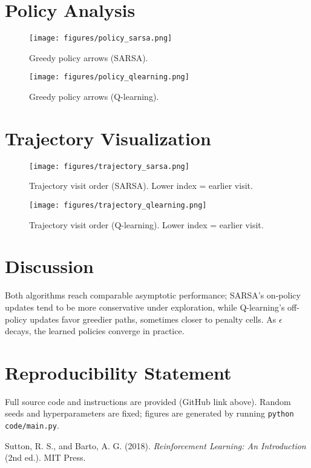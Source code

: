\documentclass[11pt]{article}
\begin{document}
\section{Policy Analysis}
\begin{figure}[H]
  \centering
  \texttt{[image: figures/policy\_sarsa.png]}
  \caption{Greedy policy arrows (SARSA).}
  \label{fig:pol_sarsa}
\end{figure}

\begin{figure}[H]
  \centering
  \texttt{[image: figures/policy\_qlearning.png]}
  \caption{Greedy policy arrows (Q-learning).}
  \label{fig:pol_q}
\end{figure}

\section{Trajectory Visualization}
\begin{figure}[H]
  \centering
  \texttt{[image: figures/trajectory\_sarsa.png]}
  \caption{Trajectory visit order (SARSA). Lower index = earlier visit.}
  \label{fig:traj_sarsa}
\end{figure}

\begin{figure}[H]
  \centering
  \texttt{[image: figures/trajectory\_qlearning.png]}
  \caption{Trajectory visit order (Q-learning). Lower index = earlier visit.}
  \label{fig:traj_q}
\end{figure}

\section{Discussion}
Both algorithms reach comparable asymptotic performance; SARSA’s on-policy updates tend to be more conservative under exploration, while Q-learning’s off-policy updates favor greedier paths, sometimes closer to penalty cells. As $\epsilon$ decays, the learned policies converge in practice.

\section*{Reproducibility Statement}
Full source code and instructions are provided (GitHub link above). Random seeds and hyperparameters are fixed; figures are generated by running \texttt{python code/main.py}.


\begin{thebibliography}{9}
 Sutton, R. S., and Barto, A. G. (2018). \textit{Reinforcement Learning: An Introduction} (2nd ed.). MIT Press.
\end{thebibliography}
\end{document}
